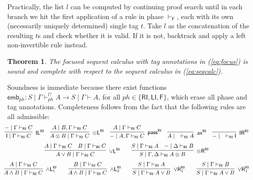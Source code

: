 \documentclass[submission,copyright,creativecommons]{eptcs}
\newtheorem{theorem}{Theorem}[section]
\theoremstyle{definition}
\newcommand{\tl}{\otimes \mathsf{L}}
\newcommand{\tr}{\otimes \mathsf{R}}
\newcommand{\pass}{\mathsf{pass}}
\newcommand{\unitl}{\mathsf{IL}}
\newcommand{\unitr}{\mathsf{IR}}
\newcommand{\andlone}{\land \mathsf{L}_{1}}
\newcommand{\andltwo}{\land \mathsf{L}_{2}}
\newcommand{\andli}{\land \mathsf{L}_{i}}
\newcommand{\orl}{\lor \mathsf{L}}
\newcommand{\orrone}{\lor \mathsf{R}_{1}}
\newcommand{\ax}{\mathsf{ax}}
\newcommand{\ot}{\otimes}
\newcommand{\I}{\mathsf{I}}
\newcommand{\RI}{\mathsf{RI}}
\newcommand{\LI}{\mathsf{LI}}
\newcommand{\F}{\mathsf{F}}
\newcommand{\tCone}{\mathbb{C}_1}
\newcommand{\tCtwo}{\mathbb{C}_2}
\begin{document}
Practically, the list $l$ can be computed by continuing proof search until in each branch we hit the first application of a rule in phase $\vdash_\F$, each with its own (necessarily uniquely determined) single tag $t$. Take $l$ as the concatenation of the resulting $t$s and check whether it is valid. If it is not, backtrack and apply a left non-invertible rule instead.

\begin{theorem}\label{theorem:focus:sound:complete}
  The focused sequent calculus with tag annotations in (\ref{eq:focus}) is sound and complete with respect to the sequent calculus in (\ref{eq:seqcalc}).
\end{theorem}
Soundness is immediate because there exist functions $\mathsf{emb}_{ph} : S \mid \Gamma \vdash^{l?}_{ph} A \to S \mid \Gamma \vdash A$, for all $ph \in \{ \RI , \LI , \F \}$, which erase all phase and tag annotations.
Completeness follows from the fact that the following rules are all admissible:
\begin{equation}\label{eq:admis}
  \small
  \hspace*{-4mm}
    \begin{array}{c}
      \infer[\unitl^{\RI}]{\I \mid \Gamma \vdash_{\RI} C}{{-} \mid \Gamma \vdash_{\RI} C}
      \quad
      \infer[\tl^{\RI}]{A \ot B \mid \Gamma \vdash_{\RI} C}{A \mid B, \Gamma \vdash_{\RI} C}
      \quad
      \infer[\pass^{\RI}]{{-} \mid A , \Gamma \vdash_{\RI} C}{A \mid \Gamma \vdash_{\RI} C}
      \quad
      \infer[\ax^{\RI}]{A \mid \quad \vdash_{\RI} A}{}
      \quad
      \infer[\unitr^{\RI}]{{-} \mid \quad \vdash_{\RI} \I}{}
  \\[6pt]
      \infer[\orl^{\RI}]{A \lor B \mid \Gamma \vdash_{\RI} C}{
      A \mid \Gamma \vdash_{\RI} C
      &
      B \mid \Gamma \vdash_{\RI} C
      }
      \qquad
      \infer[\tr^{\RI}]{S \mid \Gamma , \Delta \vdash_{\RI} A \ot B}{
        S \mid \Gamma \vdash_{\RI} A
        &
        {-} \mid \Delta \vdash_{\RI} B
      }
  \\[6pt]
      \infer[\andlone^{\RI}]{A \land B \mid \Gamma \vdash_{\RI} C}{A \mid \Gamma \vdash_{\RI} C}
      \qquad
      \infer[\andltwo^{\RI}]{A \land B \mid \Gamma \vdash_{\RI} C}{B \mid \Gamma \vdash_{\RI} C}
      \qquad
      \infer[\orrone^{\RI}]{S \mid \Gamma \vdash_{\RI} A \lor B}{S \mid \Gamma \vdash_{\RI} A}
      \qquad
      \infer[\orrone^{\RI}]{S \mid \Gamma \vdash_{\RI} A \lor B}{S \mid \Gamma \vdash_{\RI} B}
    \end{array}
  \end{equation}
\end{document}
